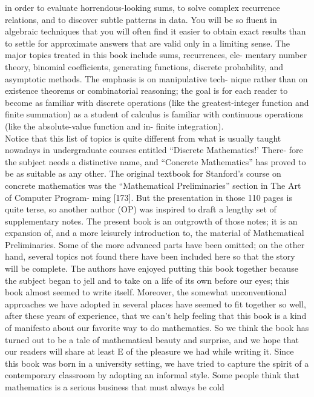 \documentclass[a4paper]{article}
\begin{document}
in order to evaluate horrendous-looking sums, to solve complex recurrence
relations, and to discover subtle patterns in data. You will be so fluent in
algebraic techniques that you will often find it easier to obtain exact results
than to settle for approximate answers that are valid only in a limiting sense.
The major topics treated in this book include sums, recurrences, ele-
mentary number theory, binomial coefficients, generating functions, discrete
probability, and asymptotic methods. The emphasis is on manipulative tech-
nique rather than on existence theorems or combinatorial reasoning; the goal
is for each reader to become as familiar with discrete operations (like the
greatest-integer function and finite summation) as a student of calculus is
familiar with continuous operations (like the absolute-value function and in-
finite integration). \\
\indent Notice that this list of topics is quite different from what is usually taught
nowadays in undergraduate courses entitled ``Discrete Mathematics!' There-
fore the subject needs a distinctive name, and ``Concrete Mathematics'' has
proved to be as suitable as any other.
The original textbook for Stanford's course on concrete mathematics was
the ``Mathematical Preliminaries'' section in The Art of Computer Program-
ming [173]. But the presentation in those 110 pages is quite terse, so another
author (OP) was inspired to draft a lengthy set of supplementary notes. The
present book is an outgrowth of those notes; it is an expansion of, and a more
leisurely introduction to, the material of Mathematical Preliminaries. Some of
the more advanced parts have been omitted; on the other hand, several topics
not found there have been included here so that the story will be complete.
The authors have enjoyed putting this book together because the subject
began to jell and to take on a life of its own before our eyes; this book almost
seemed to write itself. Moreover, the somewhat unconventional approaches
we have adopted in several places have seemed to fit together so well, after
these years of experience, that we can't help feeling that this book is a kind
of manifesto about our favorite way to do mathematics. So we think the book
has turned out to be a tale of mathematical beauty and surprise, and we hope
that our readers will share at least E of the pleasure we had while writing it.
Since this book was born in a university setting, we have tried to capture
the spirit of a contemporary classroom by adopting an informal style. Some
people think that mathematics is a serious business that must always be cold
\end{document}
